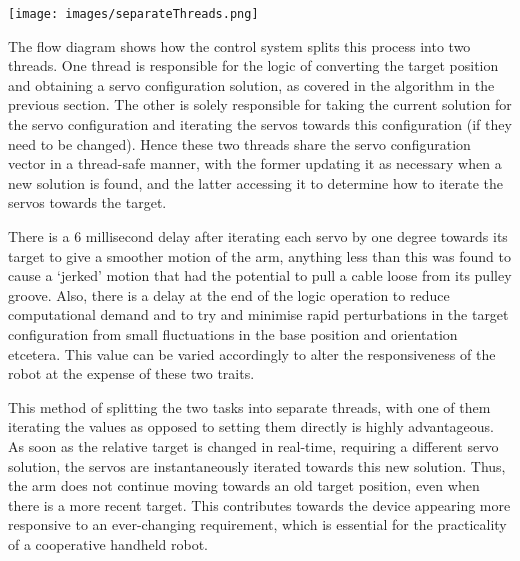 \documentclass[11pt]{article}
\begin{document}
\begin{center}
\texttt{[image: images/separateThreads.png]}
\label{figure:separateThreads}
\end{center}

The flow diagram shows how the control system splits this process into two threads. One thread is responsible for the logic of converting the target position and obtaining a servo configuration solution, as covered in the algorithm in the previous section. The other is solely responsible for taking the current solution for the servo configuration and iterating the servos towards this configuration (if they need to be changed). Hence these two threads share the servo configuration vector in a thread-safe manner, with the former updating it as necessary when a new solution is found, and the latter accessing it to determine how to iterate the servos towards the target. 

There is a 6 millisecond delay after iterating each servo by one degree towards its target to give a smoother motion of the arm, anything less than this was found to cause a `jerked' motion that had the potential to pull a cable loose from its pulley groove. Also, there is a delay at the end of the logic operation to reduce computational demand and to try and minimise rapid perturbations in the target configuration from small fluctuations in the base position and orientation etcetera. This value can be varied accordingly to alter the responsiveness of the robot at the expense of these two traits. 

This method of splitting the two tasks into separate threads, with one of them iterating the values as opposed to setting them directly is highly advantageous. As soon as the relative target is changed in real-time, requiring a different servo solution, the servos are instantaneously iterated towards this new solution. Thus, the arm does not continue moving towards an old target position, even when there is a more recent target. This contributes towards the device appearing more responsive to an ever-changing requirement, which is essential for the practicality of a cooperative handheld robot. 



\pagebreak
\end{document}
